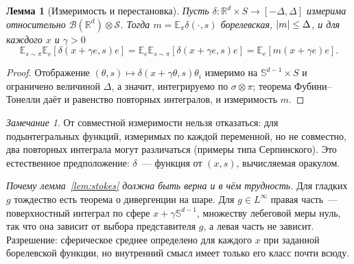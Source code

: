 \documentclass[11pt,a4paper]{article}
\numberwithin{equation}{section}
\newtheorem{lemma}[theorem]{Лемма}
\theoremstyle{definition}
\theoremstyle{remark}
\newtheorem{remark}[theorem]{Замечание}
\newcommand{\E}{\mathbb E}\newcommand{\R}{\mathbb R}\newcommand{\N}{\mathbb N}\let\Prob\relax\newcommand{\Prob}{\mathbb P}
\newcommand{\Sph}{\mathbb S^{d-1}}\newcommand{\Ball}{\mathbb B}
\begin{document}
\begin{lemma}[Измеримость и перестановка]\label{lem:fubini}
Пусть $\delta:\R^d\times S\to[-\Delta,\Delta]$ измерима относительно $\mathcal B(\R^d)\otimes\mathcal S$. Тогда $m=\E_\pi\delta(\cdot,s)$ борелевская, $\lvert m\rvert\le\Delta$, и для \emph{каждого} $x$ и $\gamma>0$
\[\E_{s\sim\pi}\E_e[\delta(x+\gamma e,s)e]=\E_e\E_{s\sim\pi}[\delta(x+\gamma e,s)e]=\E_e[m(x+\gamma e)e].\]
\end{lemma}
\begin{proof}
Отображение $(\theta,s)\mapsto\delta(x+\gamma\theta,s)\theta_i$ измеримо на $\Sph\times S$ и ограничено величиной $\Delta$, а значит, интегрируемо по $\sigma\otimes\pi$; теорема Фубини--Тонелли даёт и равенство повторных интегралов, и измеримость $m$.
\end{proof}
\begin{remark}
От совместной измеримости нельзя отказаться: для подынтегральных функций, измеримых по каждой переменной, но не совместно, два повторных интеграла могут различаться (примеры типа Серпинского). Это естественное предположение: $\delta$~--- функция от $(x,s)$, вычисляемая оракулом.
\end{remark}

\emph{Почему лемма~\ref{lem:stokes} должна быть верна и в чём трудность.} Для гладких $g$ тождество есть теорема о дивергенции на шаре. Для $g\in L^\infty$ правая часть~--- поверхностный интеграл по сфере $x+\gamma\Sph$, множеству лебеговой меры нуль, так что она зависит от выбора представителя $g$, а левая часть не зависит. Разрешение: сферическое среднее определено для каждого $x$ при заданной борелевской функции, но внутренний смысл имеет только его класс почти всюду.
\end{document}

